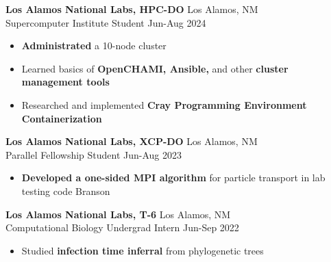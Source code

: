 \documentclass[12pt]{article}
\newcommand{\entry}[4]{{{\textbf{#1}}} \hfill #3 \\ #2 \hfill #4}
\begin{document}
\begin{minipage}[t]{0.63\textwidth}
  \entry{Los Alamos National Labs, HPC-DO}{Supercomputer Institute Student}{Los Alamos, NM}{Jun-Aug 2024}
  \begin{itemize}[noitemsep,rightmargin=0mm,topsep=0pt,leftmargin=.75cm]
    \item \textbf{Administrated} a 10-node cluster
    \item Learned basics of \textbf{OpenCHAMI, Ansible,} and other \textbf{cluster management tools}
    \item Researched and implemented \textbf{Cray Programming Environment Containerization}
  \end{itemize}

  \medskip

  \entry{Los Alamos National Labs, XCP-DO}{Parallel Fellowship Student}{Los Alamos, NM}{Jun-Aug 2023}
  \begin{itemize}[noitemsep,rightmargin=0mm,topsep=0pt,leftmargin=.75cm]
    \item {\bf Developed a one-sided MPI algorithm} for particle transport in lab testing code Branson
  \end{itemize}

  \medskip

  \entry{Los Alamos National Labs, T-6}{Computational Biology Undergrad Intern}{Los Alamos, NM}{Jun-Sep 2022}
  \begin{itemize}[noitemsep,rightmargin=0mm,topsep=0pt,leftmargin=.75cm]
    \item Studied {\bf infection time inferral} from phylogenetic trees
  \end{itemize}
\end{minipage}%
\hspace{0.04\textwidth}%
\end{document}
